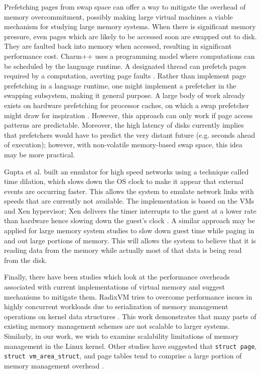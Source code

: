 \documentclass[twocolumn,11pt]{article}
\begin{document}
Prefetching pages from swap space can offer a way to mitigate the overhead of
memory overcommitment, possibly making large virtual machines a viable
mechanism for studying large memory systems. When there is significant memory
pressure, even pages which are likely to be accessed soon are swapped out to
disk. They are faulted back into memory when accessed, resulting in significant
performance cost.  Charm++ uses a programming model where computations can be
scheduled by the language runtime. A designated thread can prefetch pages
required by a computation, averting page faults \cite{charmpp}. Rather than
implement page prefetching in a language runtime, one might implement a
prefetcher in the swapping subsystem, making it general purpose. A large body
of work already exists on hardware prefetching for processor caches, on which a
swap prefetcher might draw for inspiration \cite{prefetching}. However, this
approach can only work if page access patterns are predictable. Moreover, the
high latency of disks currently implies that prefetchers would have to predict
the very distant future (e.g. seconds ahead of execution); however, with
non-volatile memory-based swap space, this idea may be more practical.

Gupta et al. built an emulator for high speed networks using a technique called
time dilation, which slows down the OS clock to make it appear that external
events are occurring faster. This allows the system to emulate network links
with speeds that are currently not available. The implementation is based on
the VMs and Xen hypervisor; Xen delivers the timer interrupts to the guest at a
lower rate than hardware hence  slowing down the guest’s clock \cite{timedil}.
A similar approach may be applied for large memory system studies to slow down
guest time while paging in and out large portions of memory. This will allows
the system to believe that it is reading data from the memory while actually
most of that data is being read from the disk.

Finally, there have been studies which look at the performance overheads
associated with current implementations of virtual memory and suggest mechanisms
to mitigate them. RadixVM tries to overcome performance issues in highly
concurrent workloads due to serialization of memory management operations on
kernel data structures \cite{radixvm}. This work demonstrates that many parts of
existing memory management schemes are not scalable to larger systems.
Similarly, in our work, we wish to examine scalability limitations of memory
management in the Linux kernel. Other studies have suggested that \texttt{struct
page}, \texttt{struct vm\_area\_struct}, and page tables tend to comprise a
large portion of memory management overhead \cite{simics, struct_page}. 
\end{document}
